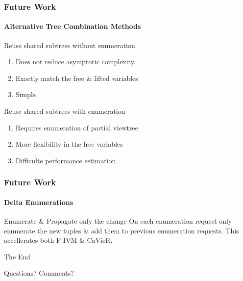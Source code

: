 \documentclass[
	11pt, %
]{beamer}
\begin{document}
\begin{frame}
	\frametitle{Future Work}
	\framesubtitle{Alternative Tree Combination Methods}
	\begin{block}{Reuse shared subtrees without enumeration}
		\begin{enumerate}
			\item Does not reduce asymptotic complexity.
			\item Exactly match the free \& lifted variables
			\item Simple
		\end{enumerate}
	\end{block}
	
		\begin{block}{Reuse shared subtrees with enumeration}
		\begin{enumerate}
			\item Requires enumeration of partial viewtree
			\item More flexibility in the free variables
			\item Difficulte performance estimation
		\end{enumerate}
	\end{block}
\end{frame}

\begin{frame}
	\frametitle{Future Work}
	\framesubtitle{Delta Enumerations}
	\begin{block}{Enumerate \& Propagate only the change}
		On each enumeration request only enumerate the new tuples \& add them to previous enumeration requests.
		This accellerates both F-IVM \& CaVieR.
	\end{block}
\end{frame}

\begin{frame}[plain] %
	\begin{center}
		{\Huge The End}
		
		\bigskip\bigskip %
		
		{\LARGE Questions? Comments?}
	\end{center}
\end{frame}

\end{document}
